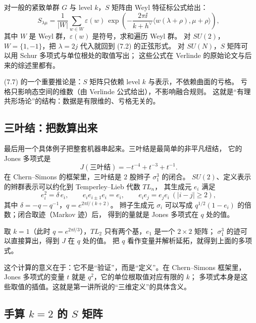 对一般的紧致单群 $G$ 与 level $k$，$S$ 矩阵由 Weyl 特征标公式给出：
\begin{equation}
S_{\lambda\mu}=\frac{1}{|W|}\sum_{w\in W}\varepsilon(w)\,
\exp\left(-\frac{2\pi\ii}{k+h^\vee}\langle w(\lambda+\rho),\mu+\rho\rangle\right), \tag{7.7}
\end{equation}
其中 $W$ 是 Weyl 群，$\varepsilon(w)$ 是符号，求和遍历 Weyl 群。
对 $SU(2)$，$W=\{1,-1\}$，把 $\lambda=2j$ 代入就回到 (7.2) 的正弦形式。
对 $SU(N)$，$S$ 矩阵可以用 Schur 多项式与单位根处的取值写出；
这些公式在 Verlinde 的原始论文与后来的综述里都有。

(7.7) 的一个重要推论是：$S$ 矩阵只依赖 level $k$ 与表示，不依赖曲面的亏格。
亏格只影响态空间的维数（由 Verlinde 公式给出），不影响融合规则。
这就是“有理共形场论”的结构：数据是有限维的、亏格无关的。

\subsection{三叶结：把数算出来}

最后用一个具体例子把整套机器串起来。三叶结是最简单的非平凡纽结，
它的 Jones 多项式是
\[
J(\text{三叶结})=-t^{-4}+t^{-3}+t^{-1}.
\]
在 Chern--Simons 的框架里，三叶结是 $2$ 股辫子 $\sigma_1^3$ 的闭合。
$SU(2)$、定义表示的辫群表示可以约化到 Temperley--Lieb 代数 $TL_n$，
其生成元 $e_i$ 满足
\[
e_i^2=\delta\,e_i,\qquad e_ie_{i\pm1}e_i=e_i,\qquad e_ie_j=e_je_i\ (|i-j|\ge2),
\]
其中 $\delta=-q-q^{-1}$，$q=e^{2\pi\ii/(k+2)}$。
辫子生成元 $\sigma_i$ 可以写成 $q^{1/2}(1-e_i)$ 的倍数；闭合取迹（Markov 迹）后，
得到的量就是 Jones 多项式在 $q$ 处的值。

取 $k=1$（此时 $q=e^{2\pi\ii/3}$），$TL_2$ 只有两个基，$e_1$ 是一个 $2\times2$ 矩阵；
$\sigma_1^3$ 的迹可以直接算出，得到 $J$ 在 $q$ 处的值。
把 $q$ 看作变量并解析延拓，就得到上面的多项式。

这个计算的意义在于：它不是“验证”，而是“定义”。在 Chern--Simons 框架里，
Jones 多项式的变量 $t$ 就是 $q^2$，它的单位根取值对应有限的 $k$；
多项式本身是这些取值的插值。这就是第一讲所说的“三维定义”的具体含义。

\subsection{手算 $k=2$ 的 $S$ 矩阵}

